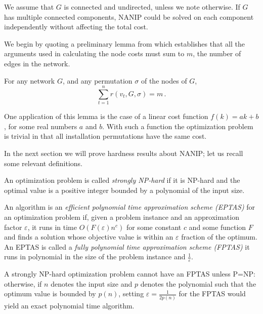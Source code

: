 We assume that $G$ is connected and undirected, unless we note otherwise. If
$G$ has multiple connected components, NANIP could be solved on each component
independently without affecting the total cost.

We begin by quoting a preliminary lemma from \cite{Gutfraind14} which
establishes that all the arguments used in calculating the node costs must sum
to $m$, the number of edges in the network.

\begin{lemma}
\label{lem:edge-decomp}
For any network $G$, and any permutation $\sigma$ of the nodes of $G$, 
\begin{equation}
\sum_{t=1}^n r(v_t,G,\sigma) = m \label{eq:edge-decomp}\,.
\end{equation}
\end{lemma}

One application of this lemma is the case of a linear cost function
$f(k)=ak+b$, for some real numbers $a$ and $b$.  With such a function the
optimization problem is trivial in that all installation permutations have the
same cost.

In the next section we will prove hardness results about NANIP; let us recall
some relevant definitions.

\begin{definition}

An optimization problem is called \emph{strongly NP-hard} if it is NP-hard and
the optimal value is a positive integer bounded by a polynomial of the input
size.

\end{definition}


\begin{definition}

An algorithm is an \emph{efficient polynomial time approximation scheme
(EPTAS)} for an optimization problem if, given a problem instance and an
approximation factor $\varepsilon$, it runs in time $O(F(\varepsilon) n^c)$
for some constant $c$ and some function $F$ and finds a solution whose
objective value is within an $\varepsilon$ fraction of the optimum. An EPTAS is
called a \emph{fully polynomial time approximation scheme (FPTAS)} it runs in
polynomial in the size of the problem instance and $\frac{1}{\varepsilon}$.  

\end{definition}

A strongly NP-hard optimization problem cannot have an FPTAS unless
P=NP: otherwise, if $n$ denotes the input size and $p$ denotes the polynomial
such that the optimum value is bounded by $p(n)$, setting
$\varepsilon=\frac{1}{2p(n)}$ for the FPTAS would yield an exact polynomial
time algorithm.

